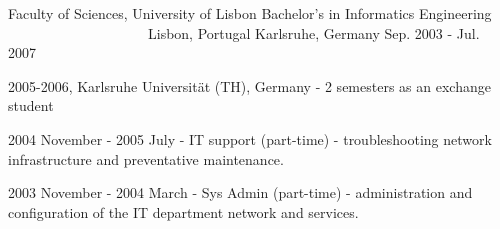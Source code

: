 \begin{cventries}

  \cventry
    {Faculty of Sciences, University of Lisbon} %
    {Bachelor's in Informatics Engineering} %
    {~~~~~~~~~~~~~~~~~~~~Lisbon, Portugal Karlsruhe, Germany} %
    {Sep. 2003 - Jul. 2007} %
    {
      \begin{cvitems} %
        \item {2005-2006, Karlsruhe Universität (TH), Germany - 2 semesters as an exchange student}
		\item {2004 November - 2005 July - IT support (part-time) - troubleshooting network infrastructure and preventative maintenance.}
		\item {2003 November - 2004 March - Sys Admin (part-time) - administration and configuration of the IT department network and services.}
      \end{cvitems}
    }

	
	

\end{cventries}
